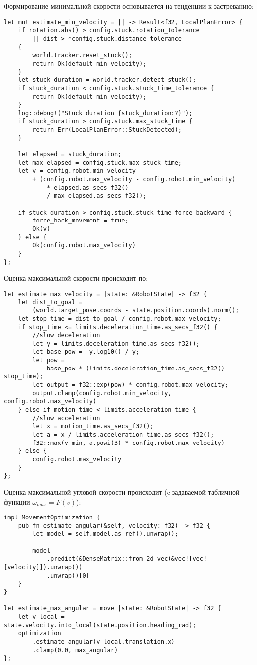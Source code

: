 Формирование минимальной скорости основывается
на тенденции к застреванию:
\begin{lstlisting}
let mut estimate_min_velocity = || -> Result<f32, LocalPlanError> {
    if rotation.abs() > config.stuck.rotation_tolerance
        || dist > *config.stuck.distance_tolerance
    {
        world.tracker.reset_stuck();
        return Ok(default_min_velocity);
    }
    let stuck_duration = world.tracker.detect_stuck();
    if stuck_duration < config.stuck.stuck_time_tolerance {
        return Ok(default_min_velocity);
    }
    log::debug!("Stuck duration {stuck_duration:?}");
    if stuck_duration > config.stuck.max_stuck_time {
        return Err(LocalPlanError::StuckDetected);
    }

    let elapsed = stuck_duration;
    let max_elapsed = config.stuck.max_stuck_time;
    let v = config.robot.min_velocity
        + (config.robot.max_velocity - config.robot.min_velocity)
            * elapsed.as_secs_f32()
            / max_elapsed.as_secs_f32();

    if stuck_duration > config.stuck.stuck_time_force_backward {
        force_back_movement = true;
        Ok(v)
    } else {
        Ok(config.robot.max_velocity)
    }
};

\end{lstlisting}

Оценка максимальной скорости происходит по:
\begin{lstlisting}
let estimate_max_velocity = |state: &RobotState| -> f32 {
    let dist_to_goal =
        (world.target_pose.coords - state.position.coords).norm();
    let stop_time = dist_to_goal / config.robot.max_velocity;
    if stop_time <= limits.deceleration_time.as_secs_f32() {
        //slow deceleration
        let y = limits.deceleration_time.as_secs_f32();
        let base_pow = -y.log10() / y;
        let pow =
            base_pow * (limits.deceleration_time.as_secs_f32() - stop_time);
        let output = f32::exp(pow) * config.robot.max_velocity;
        output.clamp(config.robot.min_velocity, config.robot.max_velocity)
    } else if motion_time < limits.acceleration_time {
        //slow acceleration
        let x = motion_time.as_secs_f32();
        let a = x / limits.acceleration_time.as_secs_f32();
        f32::max(v_min, a.powi(3) * config.robot.max_velocity)
    } else {
        config.robot.max_velocity
    }
};
\end{lstlisting}

Оценка максимальной угловой скорости происходит (c задаваемой табличной функции $\omega_{max} = F(v)$):
\begin{lstlisting}
impl MovementOptimization {
    pub fn estimate_angular(&self, velocity: f32) -> f32 {
        let model = self.model.as_ref().unwrap();

        model
            .predict(&DenseMatrix::from_2d_vec(&vec![vec![velocity]]).unwrap())
            .unwrap()[0]
    }
}

let estimate_max_angular = move |state: &RobotState| -> f32 {
    let v_local = state.velocity.into_local(state.position.heading_rad);
    optimization
        .estimate_angular(v_local.translation.x)
        .clamp(0.0, max_angular)
};
\end{lstlisting}

